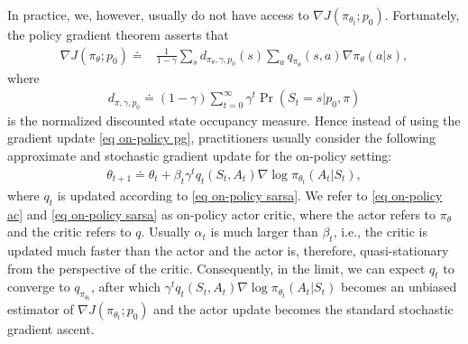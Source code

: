 \documentclass[twoside,11pt]{article}
\numberwithin{assucounter}{section}
\begin{document}
In practice,
we, however, usually do not have access to $\nabla J(\pi_{\theta_t}; p_0)$.
Fortunately, 
the policy gradient theorem \citep{sutton2000policy} asserts that
\begin{align}
  \nabla J(\pi_{\theta}; p_0) \doteq& \frac{1}{1 - \gamma} \sum_s d_{\pi_\theta, \gamma, p_0}(s) \sum_a q_{\pi_\theta}(s, a) \nabla \pi_\theta(a|s),
\end{align} 
where 
\begin{align}
  d_{\pi, \gamma, p_0} \doteq (1 - \gamma)\sum_{t=0}^\infty \gamma^t \Pr(S_t = s | p_0, \pi)
\end{align}
is the normalized discounted state occupancy measure.
Hence instead of using the gradient update \eqref{eq on-policy pg},
practitioners usually consider the following approximate and stochastic gradient update for the on-policy setting:
\begin{align}
  \label{eq on-policy ac}
  \theta_{t+1} \doteq \theta_t + \beta_t \gamma^t q_t(S_t, A_t) \nabla \log \pi_{\theta_t}(A_t | S_t),
\end{align} 
where $q_t$ is updated according to \eqref{eq on-policy sarsa}.
We refer to \eqref{eq on-policy ac} and \eqref{eq on-policy sarsa} as on-policy actor critic,
where the actor refers to $\pi_\theta$ and the critic refers to $q$.
Usually $\alpha_t$ is much larger than $\beta_t$,
i.e.,
the critic is updated much faster than the actor and the actor is, therefore, 
quasi-stationary from the perspective of the critic.
Consequently,
in the limit,
we can expect $q_t$ to converge to $q_{\pi_{\theta_t}}$,
after which
$\gamma^t q_t(S_t, A_t) \nabla \log \pi_{\theta_t}(A_t | S_t)$ becomes an unbiased estimator of $\nabla J(\pi_{\theta_t}; p_0)$ and the actor update becomes the standard stochastic gradient ascent.
\end{document}
